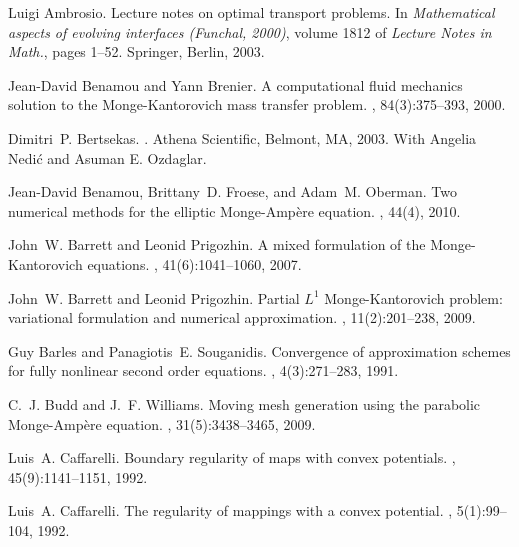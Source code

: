 \documentclass{amsart}
\theoremstyle{lemma}
\theoremstyle{remark}
\begin{document}
\begin{thebibliography}{CKKSE97}

Luigi Ambrosio.
\newblock Lecture notes on optimal transport problems.
\newblock In {\em Mathematical aspects of evolving interfaces ({F}unchal,
  2000)}, volume 1812 of {\em Lecture Notes in Math.}, pages 1--52. Springer,
  Berlin, 2003.

Jean-David Benamou and Yann Brenier.
\newblock A computational fluid mechanics solution to the {M}onge-{K}antorovich
  mass transfer problem.
, 84(3):375--393, 2000.

Dimitri~P. Bertsekas.
.
\newblock Athena Scientific, Belmont, MA, 2003.
\newblock With Angelia Nedi\'c and Asuman E. Ozdaglar.

Jean-David Benamou, Brittany~D. Froese, and Adam~M. Oberman.
\newblock Two numerical methods for the elliptic {M}onge-{A}mp\`ere equation.
, 44(4), 2010.

John~W. Barrett and Leonid Prigozhin.
\newblock A mixed formulation of the {M}onge-{K}antorovich equations.
, 41(6):1041--1060, 2007.

John~W. Barrett and Leonid Prigozhin.
\newblock Partial {$L^1$} {M}onge-{K}antorovich problem: variational
              formulation and numerical approximation.
, 11(2):201--238, 2009.

Guy Barles and Panagiotis~E. Souganidis.
\newblock Convergence of approximation schemes for fully nonlinear second order
  equations.
, 4(3):271--283, 1991.

C.~J. Budd and J.~F. Williams.
\newblock Moving mesh generation using the parabolic {M}onge-{A}mp\`ere
  equation.
, 31(5):3438--3465, 2009.

Luis~A. Caffarelli.
\newblock Boundary regularity of maps with convex potentials.
, 45(9):1141--1151, 1992.

Luis~A. Caffarelli.
\newblock The regularity of mappings with a convex potential.
, 5(1):99--104, 1992.


\end{thebibliography}
\end{document}
